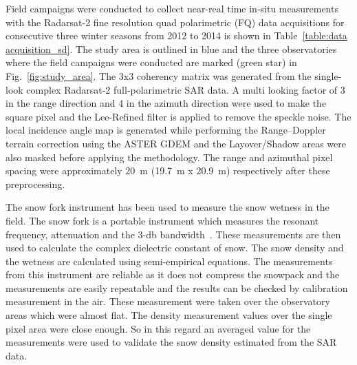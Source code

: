 Field campaigns were conducted to collect near-real time in-situ measurements with the Radarsat-2 fine resolution quad polarimetric (FQ) data acquisitions for consecutive three winter seasons from 2012 to 2014 is shown in Table~\ref{table:data acquisition_sd}. The study area is outlined in blue and the three observatories where the field campaigns were conducted are marked (green star) in Fig.~\ref{fig:study_area}. The 3x3 coherency matrix was generated from the single-look complex Radarsat-2 full-polarimetric SAR data. A multi looking factor of 3 in the range direction and 4 in the azimuth direction were used to make the square pixel and the Lee-Refined filter is applied to remove the speckle noise. The local incidence angle map is generated while performing the Range–Doppler terrain correction using the ASTER GDEM and the Layover/Shadow areas were also masked before applying the methodology. The range and azimuthal pixel spacing were approximately 20~m (19.7~m x 20.9~m) respectively after these preprocessing.

The snow fork instrument has been used to measure the snow wetness in the field. The snow fork is a portable instrument which measures the resonant frequency, attenuation and the 3-db bandwidth~\citep{sihvola1986snow}. These measurements are then used to calculate the complex dielectric constant of snow. The snow density and the wetness are calculated using semi-empirical equations. The measurements from this instrument are reliable as it does not compress the snowpack and the measurements are easily repeatable and the results can be checked by calibration measurement in the air. These measurement were taken over the observatory areas which were almost flat. The density measurement values over the single pixel area were close enough. So in this regard an averaged value for the measurements were used to validate the snow density estimated from the SAR data.   

